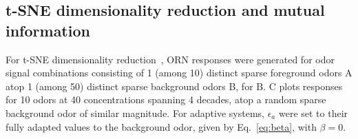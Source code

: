 \documentclass[9pt,lineno]{elife}
\begin{document}
\subsection{t-SNE dimensionality reduction and mutual information} 



For t-SNE dimensionality reduction~\citep{tsne}, ORN responses were generated for odor signal combinations consisting of 1 (among 10) distinct sparse foreground odors A atop 1 (among 50) distinct sparse background odors B, for B.  C plots responses for 10 odors at 40 concentrations spanning 4 decades, atop a random sparse background odor of similar magnitude. For adaptive systems, $\epsilon_a$ were set to their fully adapted values to the background odor, given by Eq.~\ref{eq:beta}, with $\beta = 0$. 
\end{document}
